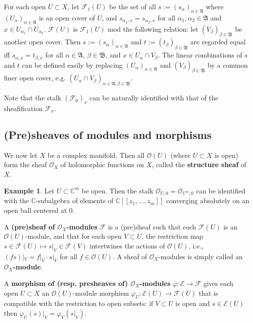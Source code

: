\documentclass[11pt,b5paper,notitlepage]{article}
\theoremstyle{definition}
\newtheorem{eg}[df]{Example}
\theoremstyle{plain}
\newcommand{\fk}{\mathfrak}
\newcommand{\scr}{\mathscr}
\newcommand{\Cbb}{\mathbb C}
\numberwithin{equation}{section}
\begin{document}
For each open $U\subset X$, let $\scr F_1(U)$ be the set of all $s:=(s_\alpha)_{\alpha\in\fk A}$ where $(U_\alpha)_{\alpha\in\fk A}$ is an open cover of $U$, and $s_{\alpha_1,x}=s_{\alpha_2,x}$ for all $\alpha_1,\alpha_2\in\fk A$ and $x\in U_{\alpha_1}\cap U_{\alpha_2}$. $\scr F(U)$ is $\scr F_1(U)$ mod the following relation: let $(V_\beta)_{\beta\in\fk B}$ be another open cover. Then $s:=(s_\alpha)_{\alpha\in\fk A}$ and $t:=(t_\beta)_{\beta\in\fk B}$ are regarded equal iff $s_{\alpha,x}=t_{\beta,x}$ for all $\alpha\in\fk A$, $\beta\in\fk B$, and $x\in U_\alpha\cap V_\beta$. The linear combinations of $s$ and $t$ can be defined easily by replacing $(U_\alpha)_{\alpha\in\fk A}$ and $(V_\beta)_{\beta\in\fk B}$ by a common finer open cover, e.g. $(U_\alpha\cap V_\beta)_{\alpha\in\fk A,\beta\in\fk B}$.


Note that the stalk $(\scr F_0)_x$ can be naturally identified with that of the sheafification $\scr F_x$.


\subsection{(Pre)sheaves of modules and morphisms}

We now let $X$ be a complex manifold. Then all $\scr O(U)$ (where $U\subset X$ is open) form the sheaf $\scr O_X$ of holomorphic functions on $X$, called the \textbf{structure sheaf} of $X$.

\begin{eg}
Let $U\subset\Cbb^m$ be open. Then the stalk $\scr O_{U,0}=\scr O_{\Cbb^m,0}$ can be identified with the $\Cbb$-subalgebra of elements of $\Cbb[[z_1,\dots,z_m]]$ converging absolutely on an open ball centered at $0$.
\end{eg}

A \textbf{(pre)sheaf of $\scr O_X$-modules} $\scr F$ is a (pre)sheaf such that each $\scr F(U)$ is an $\scr O(U)$-module, and that for each open $V\subset U$, the restriction map $s\in\scr F(U)\mapsto s|_V\in\scr F(V)$ intertwines the actions of $\scr O(U)$, i.e., $(fs)|_V=f|_V\cdot s|_V$ for all $f\in\scr O(U)$. A sheaf of $\scr O_X$-modules is simply called an \textbf{$\scr O_X$-module}.


A \textbf{morphism of (resp. presheaves of) $\scr O_X$-modules} $\varphi:\scr E\rightarrow\scr F$ gives each open $U\subset X$ an $\scr O(U)$-module morphism $\varphi_U:\scr E(U)\rightarrow\scr F(U)$ that is compatible with the restriction to open subsets: if $V\subset U$ is open and $s\in\scr E(U)$ then $\varphi_U(s)|_V=\varphi_V(s|_V)$.  
\end{document}
